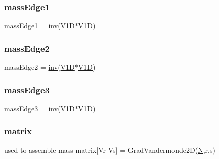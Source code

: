 \subsubsection{\texorpdfstring{mass\+Edge1}{massEdge1}}
{\footnotesize\ttfamily mass\+Edge1 = \hyperlink{a00473_a0c752aad07d6c7e22d2e63df41ccdf8b}{inv}(\hyperlink{a00473_a015213f82f9dfc2bc247c0778f3bc120}{V1D}$\ast$\hyperlink{a00473_a015213f82f9dfc2bc247c0778f3bc120}{V1D}\textquotesingle{})}

\mbox{\label{a01014_a368aa65f00289fa5bef3ec6e0645499d}} 
\subsubsection{\texorpdfstring{mass\+Edge2}{massEdge2}}
{\footnotesize\ttfamily mass\+Edge2 = \hyperlink{a00473_a0c752aad07d6c7e22d2e63df41ccdf8b}{inv}(\hyperlink{a00473_a015213f82f9dfc2bc247c0778f3bc120}{V1D}$\ast$\hyperlink{a00473_a015213f82f9dfc2bc247c0778f3bc120}{V1D}\textquotesingle{})}

\mbox{\label{a01014_af00cee47bb233fdc11ecc42cf3eff646}} 
\subsubsection{\texorpdfstring{mass\+Edge3}{massEdge3}}
{\footnotesize\ttfamily mass\+Edge3 = \hyperlink{a00473_a0c752aad07d6c7e22d2e63df41ccdf8b}{inv}(\hyperlink{a00473_a015213f82f9dfc2bc247c0778f3bc120}{V1D}$\ast$\hyperlink{a00473_a015213f82f9dfc2bc247c0778f3bc120}{V1D}\textquotesingle{})}

\mbox{\label{a01014_af07ff1035f34d77764ff516f110e6832}} 
\subsubsection{\texorpdfstring{matrix}{matrix}}
{\footnotesize\ttfamily used to assemble mass matrix\mbox{[}Vr Vs\mbox{]} = Grad\+Vandermonde2D(\hyperlink{a00473_a5b9c4563028063ee53b517cce9aa701b}{N},r,s)}

